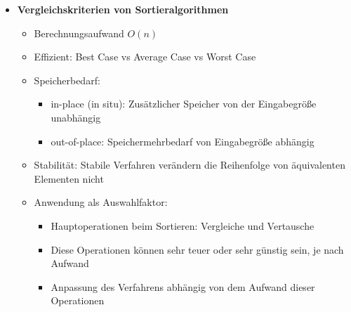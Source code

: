 \begin{itemize}
        \item \textbf{Vergleichskriterien von Sortieralgorithmen}
            \begin{itemize}
                \item Berechnungsaufwand $O(n)$
                \item Effizient: Best Case vs Average Case vs Worst Case
                \item Speicherbedarf:
                    \begin{itemize}
                        \item in-place (in situ): Zusätzlicher Speicher von der Eingabegrö\ss e unabhängig
                        \item out-of-place: Speichermehrbedarf von Eingabegrö\ss e abhängig
                    \end{itemize}
                \item Stabilität: Stabile Verfahren verändern die Reihenfolge von äquivalenten Elementen nicht
                \item Anwendung als Auswahlfaktor: 
                    \begin{itemize}
                        \item Hauptoperationen beim Sortieren: Vergleiche und Vertausche
                        \item Diese Operationen können sehr teuer oder sehr günstig sein, je nach Aufwand
                        \item Anpassung des Verfahrens abhängig von dem Aufwand dieser Operationen
                    \end{itemize}    
            \end{itemize}
    \end{itemize}    

    

